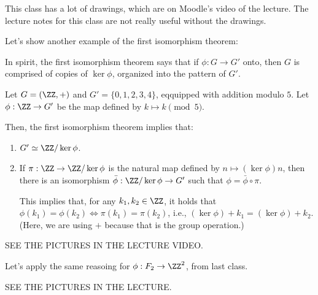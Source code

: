 
\begin{rem}
	This class has a lot of drawings, which are on Moodle's video of the lecture. The lecture notes for this class are not really useful without the drawings.
\end{rem}

Let's show another example of the first isomorphism theorem:

In spirit, the first isomorphism theorem says that if $\phi: G \to G'$ onto, then $G$ is comprised of copies of $\ker \phi$, organized into the pattern of $G'$.

\begin{exmp}
	Let $G = (\ZZ, +)$ and $G' = \{0, 1, 2, 3, 4\}$, eqquipped with addition modulo $5$.
	Let $\phi: \ZZ \to G'$ be the map defined by $k \mapsto k \pmod{5}$.

	Then, the first isomorphism theorem implies that:
	\begin{enumerate}
		\item $G' \simeq \ZZ/\ker\phi$.
		\item If $\pi: \ZZ \to \ZZ / \ker\phi$ is the natural map defined by $n \mapsto (\ker\phi)n$, then there is an isomorphism $\bar\phi: \ZZ/\ker\phi \to G'$ such that $\phi = \bar\phi \circ \pi$. 

			This implies that, for any $k_1, k_2 \in \ZZ$, it holds that $\phi(k_1) = \phi(k_2) \iff \pi(k_1) = \pi(k_2)$, i.e., $(\ker\phi) + k_1 = (\ker\phi) + k_2$. (Here, we are using $+$ because that is the group operation.)
	\end{enumerate}

	SEE THE PICTURES IN THE LECTURE VIDEO.
\end{exmp}

\begin{exmp}
	Let's apply the same reasoing for $\phi: F_2 \to \ZZ^2$, from last class.

	SEE THE PICTURES IN THE LECTURE.
\end{exmp}



